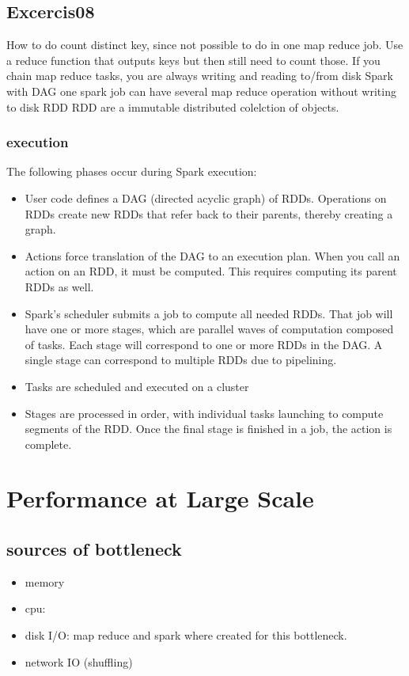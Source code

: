 \subsection{Excercis08}
How to do count distinct key, since not possible to do in one map reduce job.
Use a reduce function that outputs keys but then still need to count those.
If you chain map reduce tasks, you are always writing and reading to/from disk \textrightarrow Spark with DAG
one spark job can have several map reduce operation without writing to disk \textrightarrow RDD
RDD are a immutable distributed colelction of objects.


\subsubsection{execution}
The following phases occur during Spark execution:
\begin{itemize}
    \item User code defines a DAG (directed acyclic graph) of RDDs. Operations on RDDs create new RDDs that refer back to their parents, thereby creating a graph.
    \item Actions force translation of the DAG to an execution plan. When you call an action on an RDD, it must be computed. This requires computing its parent RDDs as well.
    \item Spark's scheduler submits a job to compute all needed RDDs. That job will have one or more stages, which are parallel waves of computation composed of tasks. Each stage will correspond to one or more RDDs in the DAG. A single stage can correspond to multiple RDDs due to pipelining.
    \item Tasks are scheduled and executed on a cluster
    \item Stages are processed in order, with individual tasks launching to compute segments of the RDD. Once the final stage is finished in a job, the action is complete.
\end{itemize}




\section{Performance at Large Scale}
\subsection{sources of bottleneck}
\begin{itemize}
    \item memory
    \item cpu:
    \item disk I/O: map reduce and spark where created for this bottleneck.
    \item network IO (shuffling)
\end{itemize}

